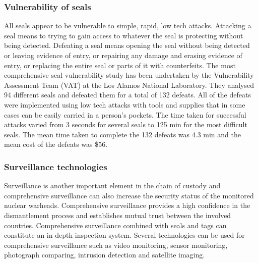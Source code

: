 \documentclass[twoside,titlepage,11pt,twocolumn,a4paper]{article}
\begin{document}
\subsubsection{Vulnerability of seals}
All seals appear to be vulnerable to simple, rapid, low tech
attacks. Attacking a seal means to trying to gain access to whatever
the seal is protecting without being detected. Defeating a seal means
opening the seal without being detected or leaving evidence of entry,
or repairing any damage and erasing evidence of entry, or replacing
the entire seal or parts of it with counterfeits. The most
comprehensive seal vulnerability study has been undertaken by the
Vulnerability Assessment Team (VAT) at the Los Alamos National
Laboratory. They analysed 94 different seals and defeated them for a
total of 132 defeats. All of the defeats were implemented using low
tech attacks with tools and supplies that in some cases can be easily
carried in a person’s pockets. The time taken for successful attacks
varied from 3 seconds for several seals to 125 min for the most
difficult seals. The mean time taken to complete the 132 defeats was
4.3 min and the mean cost of the defeats was \$56. \citep{vulnSecSeals1997}

\subsubsection{Surveillance technologies}
Surveillance is another important element in the chain of custody and
comprehensive surveillance can also increase the security status of
the monitored nuclear warheads. Comprehensive surveillance provides a
high confidence in the dismantlement process and establishes mutual
trust between the involved countries. Comprehensive surveillance
combined with seals and tags can constitute an in depth inspection
system. Several technologies can be used for comprehensive
surveillance such as video monitoring, sensor monitoring, photograph
comparing, intrusion detection and satellite
imaging. \citep{wuwen2004}
\end{document}
